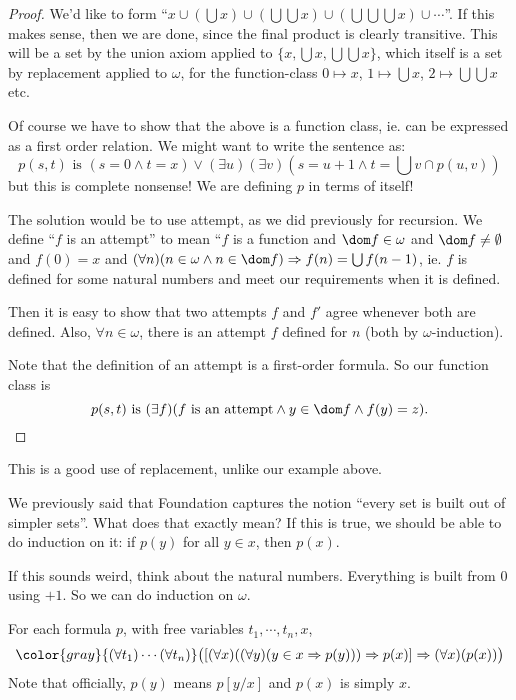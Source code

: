 \documentclass[a4paper]{article}
\begin{document}
\begin{proof}
  We'd like to form ``$x\cup (\bigcup x)\cup (\bigcup\bigcup x)\cup (\bigcup\bigcup\bigcup x)\cup \cdots$''. If this makes sense, then we are done, since the final product is clearly transitive. This will be a set by the union axiom applied to $\{x, \bigcup x, \bigcup\bigcup x\}$, which itself is a set by replacement applied to $\omega$, for the function-class $0\mapsto x$, $1\mapsto \bigcup x$, $2\mapsto \bigcup\bigcup x$ etc.

  Of course we have to show that the above is a function class, ie. can be expressed as a first order relation. We might want to write the sentence as:
  \[
    p(s, t)\text{ is }(s = 0\wedge t = x)\vee (\exists u)(\exists v)(s = u + 1\wedge t = \textstyle{\bigcup} v \cap p(u, v))
  \]
  but this is complete nonsense! We are defining $p$ in terms of itself!

  The solution would be to use attempt, as we did previously for recursion. We define ``$f$ is an attempt'' to mean ``$f$ is a function and $\dom f\in \omega$ and $\dom f\not=\emptyset$ and $f(0) = x$ and $(\forall n)(n\in \omega \wedge n\in \dom f)\Rightarrow f(n) = \bigcup f(n - 1)$, ie. $f$ is defined for some natural numbers and meet our requirements when it is defined.

  Then it is easy to show that two attempts $f$ and $f'$ agree whenever both are defined. Also, $\forall n\in \omega$, there is an attempt $f$ defined for $n$ (both by $\omega$-induction).

  Note that the definition of an attempt is a first-order formula. So our function class is
  \[
    p(s, t)\text{ is } (\exists f)(f\text{ is an attempt}\wedge y\in \dom f \wedge f(y) = z).
  \]
\end{proof}
This is a good use of replacement, unlike our example above.

We previously said that Foundation captures the notion ``every set is built out of simpler sets''. What does that exactly mean? If this is true, we should be able to do induction on it: if $p(y)$ for all $y\in x$, then $p(x)$.

If this sounds weird, think about the natural numbers. Everything is built from $0$ using $+1$. So we can do induction on $\omega$.

\begin{thm}
  For each formula $p$, with free variables $t_1, \cdots, t_n, x$,
  \[
    {\color{gray}{(\forall t_1)\cdots(\forall t_n)}}\big([(\forall x)((\forall y)(y\in x \Rightarrow p(y))) \Rightarrow  p(x)] \Rightarrow  (\forall x)(p(x))\big)
  \]
  Note that officially, $p(y)$ means $p[y/x]$ and $p(x)$ is simply $x$.
\end{thm}
\end{document}
